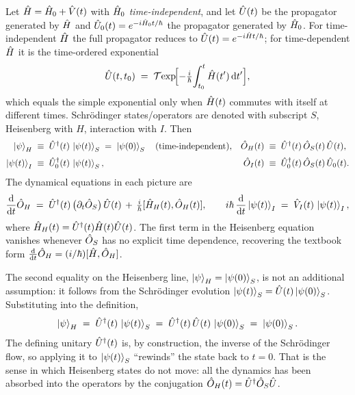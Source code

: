\begin{statement}
\label{stmt:pictures}
Let $\hat{H}=\hat{H}_0+\hat{V}(t)$ with $\hat{H}_0$
\emph{time-independent}, and let $\hat{U}(t)$ be the propagator
generated by $\hat{H}$ and $\hat{U}_0(t)=e^{-i\hat{H}_0 t/\hbar}$ the
propagator generated by $\hat{H}_0$. For time-independent $\hat{H}$
the full propagator reduces to $\hat{U}(t)=e^{-i\hat{H}t/\hbar}$; for
time-dependent $\hat{H}$ it is the time-ordered exponential
\begin{equation}
\label{eq:full-prop-T-ordered}
\hat{U}(t,t_0) \;=\; \mathcal{T}\!\exp\!\Bigl[-\tfrac{i}{\hbar}\!\int_{t_0}^t \hat{H}(t')\,\dd t'\Bigr],
\end{equation}
which equals the simple exponential only when $\hat{H}(t)$ commutes
with itself at different times. Schr\"odinger states/operators are
denoted with subscript $S$, Heisenberg with $H$, interaction with
$I$. Then
\begin{align}
\ket{\psi}_H &\;\equiv\; \hat{U}^\dagger(t)\,\ket{\psi(t)}_S
              \;=\; \ket{\psi(0)}_S
\quad(\text{time-independent}), &
\hat{O}_H(t) &\;\equiv\; \hat{U}^\dagger(t)\,\hat{O}_S(t)\,\hat{U}(t),
\\[2pt]
\ket{\psi(t)}_I &\;\equiv\; \hat{U}_0^\dagger(t)\,\ket{\psi(t)}_S, &
\hat{O}_I(t) &\;\equiv\; \hat{U}_0^\dagger(t)\,\hat{O}_S(t)\,\hat{U}_0(t).
\end{align}
The dynamical equations in each picture are
\begin{equation}
\dv{t}\hat{O}_H \;=\; \hat{U}^\dagger(t)\,\bigl(\partial_t\hat{O}_S\bigr)\,\hat{U}(t)
\,+\, \tfrac{i}{\hbar}[\hat{H}_H(t),\hat{O}_H(t)],
\qquad
i\hbar\,\dv{t}\ket{\psi(t)}_I \;=\; \hat{V}_I(t)\,\ket{\psi(t)}_I,
\end{equation}
where $\hat{H}_H(t)=\hat{U}^\dagger(t)\hat{H}(t)\hat{U}(t)$. The first
term in the Heisenberg equation vanishes whenever $\hat{O}_S$ has no
explicit time dependence, recovering the textbook form
$\dv{t}\hat{O}_H=(i/\hbar)[\hat{H},\hat{O}_H]$.
\end{statement}

\begin{remark}
The second equality on the Heisenberg line,
$\ket{\psi}_H=\ket{\psi(0)}_S$, is not an additional assumption: it
follows from the Schr\"odinger evolution
$\ket{\psi(t)}_S=\hat{U}(t)\ket{\psi(0)}_S$. Substituting into the
definition,
\begin{equation}
\ket{\psi}_H \;=\; \hat{U}^\dagger(t)\,\ket{\psi(t)}_S
              \;=\; \hat{U}^\dagger(t)\,\hat{U}(t)\,\ket{\psi(0)}_S
              \;=\; \ket{\psi(0)}_S.
\end{equation}
The defining unitary $\hat{U}^\dagger(t)$ is, by construction, the
inverse of the Schr\"odinger flow, so applying it to
$\ket{\psi(t)}_S$ ``rewinds'' the state back to $t=0$. That is the
sense in which Heisenberg states do not move: all the dynamics has
been absorbed into the operators by the conjugation
$\hat{O}_H(t)=\hat{U}^\dagger\hat{O}_S\hat{U}$.
\end{remark}

